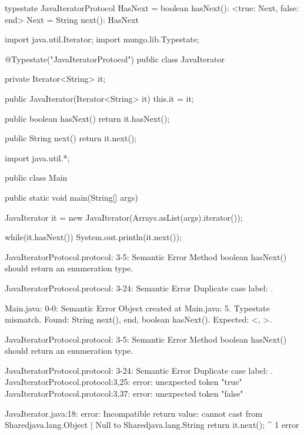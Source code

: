 \begin{code}
typestate JavaIteratorProtocol {
  HasNext = {
    boolean hasNext(): <true: Next, false: end>
  }
  Next = {
    String next(): HasNext
  }
}\end{code}

\begin{code}
import java.util.Iterator;
import mungo.lib.Typestate;

@Typestate("JavaIteratorProtocol")
public class JavaIterator {

  private Iterator<String> it;

  public JavaIterator(Iterator<String> it) {
    this.it = it;
  }

	public boolean hasNext() {
    return it.hasNext();
  }

  public String next() {
    return it.next();
  }

}\end{code}

\begin{code}
import java.util.*;

public class Main {
	public static void main(String[] args) {
		JavaIterator it = new JavaIterator(Arrays.asList(args).iterator());
    
    while(it.hasNext()){
      System.out.println(it.next());
    }
	}
}\end{code}

\lstset{language=,caption=Mungo's output}
\begin{code}

JavaIteratorProtocol.protocol: 3-5: Semantic Error
		Method boolean hasNext() should return an enumeration type.

JavaIteratorProtocol.protocol: 3-24: Semantic Error
		Duplicate case label: .

Main.java: 0-0: Semantic Error
		Object created at Main.java: 5. Typestate mismatch. Found: String next(), end, boolean hasNext(). Expected: <, >.

JavaIteratorProtocol.protocol: 3-5: Semantic Error
		Method boolean hasNext() should return an enumeration type.

JavaIteratorProtocol.protocol: 3-24: Semantic Error
		Duplicate case label: .
JavaIteratorProtocol.protocol:3,25: error: unexpected token "true"
JavaIteratorProtocol.protocol:3,37: error: unexpected token "false"
\end{code}

\lstset{language=,caption=Our tool's output}
\begin{code}
JavaIterator.java:18: error: Incompatible return value: cannot cast from Shared{java.lang.Object} | Null to Shared{java.lang.String}
    return it.next();
    ^
1 error
\end{code}


